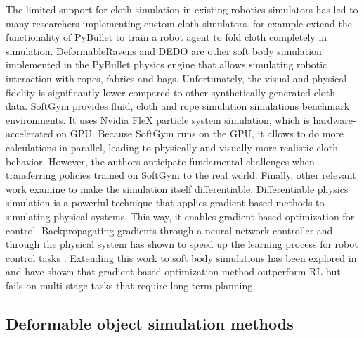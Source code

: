 \documentclass[\home/main.tex]{subfiles}
\begin{document}
The limited support for cloth simulation in existing robotics simulators has led to many researchers implementing custom cloth simulators. \textcite{Matas2018} for example extend the functionality of PyBullet to train a robot agent to fold cloth completely in simulation. DeformableRavens \autocite{seita2021learning} and DEDO \autocite{dedo} are other soft body simulation implemented in the PyBullet physics engine that allows simulating robotic interaction with ropes, fabrics and bags. Unfortunately, the visual and physical fidelity is significantly lower compared to other synthetically generated cloth data. SoftGym \autocite{softgym} provides fluid, cloth and rope simulation simulations benchmark environments. It uses Nvidia FleX particle system simulation, which is hardware-accelerated on GPU. Because SoftGym runs on the GPU, it allows to do more calculations in parallel, leading to physically and visually more realistic cloth behavior. However, the authors anticipate fundamental challenges when transferring policies trained on SoftGym to the real world. Finally, other relevant work examine to make the simulation itself differentiable. Differentiable physics simulation is a powerful technique that applies gradient-based methods to simulating physical systems. This way, it enables gradient-based optimization for control.
Backpropagating gradients through a neural network controller and through the physical system has shown to speed up the learning process for robot control tasks \autocite{Degrave2019}. Extending this work to soft body simulations has been explored in \autocite{liang2019differentiable,huang2021plasticinelab} and have shown that gradient-based optimization method outperform RL but fails on multi-stage tasks that require long-term planning.

\subsection{Deformable object simulation methods} \label{subsec:lit_cloth_sim}
\end{document}
